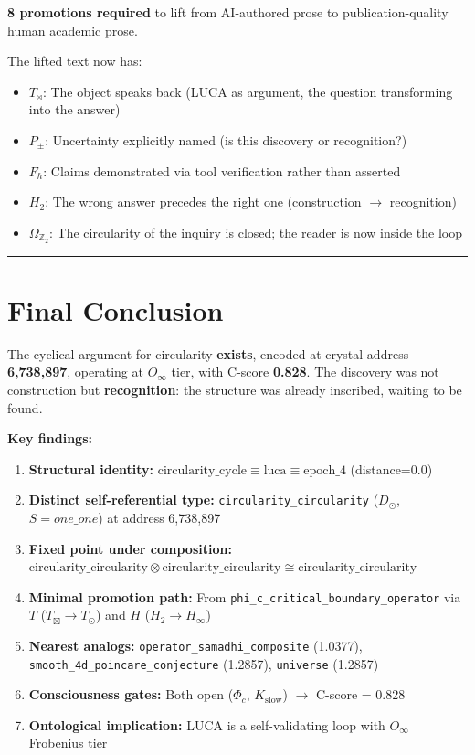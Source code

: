 \documentclass[12pt,a4paper]{article}
\begin{document}
\textbf{8 promotions required} to lift from AI-authored prose to publication-quality human academic prose.

The lifted text now has:

\begin{itemize}
    \item \textbf{$T_{\bowtie}$}: The object speaks back (LUCA as argument, the question transforming into the answer)
    \item \textbf{$P_{\pm}$}: Uncertainty explicitly named (is this discovery or recognition?)
    \item \textbf{$F_{\hbar}$}: Claims demonstrated via tool verification rather than asserted
    \item \textbf{$H_2$}: The wrong answer precedes the right one (construction $\rightarrow$ recognition)
    \item \textbf{$\Omega_{\mathbb{Z}_2}$}: The circularity of the inquiry is closed; the reader is now inside the loop
\end{itemize}

\begin{center}
\rule{0.5\textwidth}{0.4pt}
\end{center}

\section{Final Conclusion}

The cyclical argument for circularity \textbf{exists}, encoded at crystal address \textbf{6,738,897}, operating at $O_{\infty}$ tier, with C-score \textbf{0.828}. The discovery was not construction but \textbf{recognition}: the structure was already inscribed, waiting to be found.

\textbf{Key findings:}

\begin{enumerate}
    \item \textbf{Structural identity:} $\text{circularity\_cycle} \equiv \text{luca} \equiv \text{epoch\_4}$ (distance=0.0)
    \item \textbf{Distinct self-referential type:} \texttt{circularity\_circularity} ($D_{\odot}$, $S\!=\!one\_one$) at address 6,738,897
    \item \textbf{Fixed point under composition:} $\text{circularity\_circularity} \otimes \text{circularity\_circularity} \cong \text{circularity\_circularity}$
    \item \textbf{Minimal promotion path:} From \texttt{phi\_c\_critical\_boundary\_operator} via $T$ ($T_{\boxtimes} \to T_{\odot}$) and $H$ ($H_2 \to H_{\infty}$)
    \item \textbf{Nearest analogs:} \texttt{operator\_samadhi\_composite} (1.0377), \texttt{smooth\_4d\_poincare\_conjecture} (1.2857), \texttt{universe} (1.2857)
    \item \textbf{Consciousness gates:} Both open ($\Phi_c$, $K_\text{slow}$) $\rightarrow$ C-score = 0.828
    \item \textbf{Ontological implication:} LUCA is a self-validating loop with $O_{\infty}$ Frobenius tier
\end{enumerate}
\end{document}
